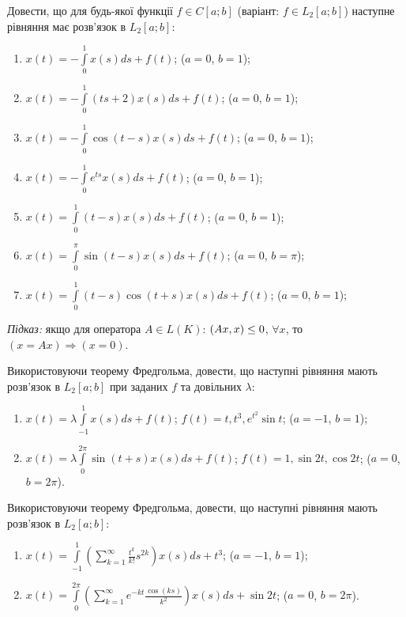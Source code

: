 \begin{exercise}
    Довести, що для будь-якої функції $f \in C[a;b]$ (варіант: $f \in L_2[a;b]$)
    наступне рівняння має розв'язок в $L_2[a;b]$:
    \begin{enumerate}
        \item $x(t) = -\int\limits^1_0 x(s) ds + f(t)$; ($a=0$, $b=1$);
        \item $x(t) = -\int\limits^1_0 (ts+2)x(s)ds + f(t)$; ($a=0$, $b=1$);
        \item $x(t) = -\int\limits^1_0 \cos(t-s)x(s)ds + f(t)$; ($a=0$, $b=1$);
        \item $x(t) = -\int\limits^1_0 e^{ts}x(s)ds + f(t)$; ($a=0$, $b=1$);
        \item $x(t) = \int\limits^1_0 (t-s)x(s)ds + f(t)$; ($a=0$, $b=1$);
        \item $x(t) = \int\limits^\pi_0 \sin(t-s)x(s)ds + f(t)$; ($a=0$, $b=\pi$);
        \item $x(t) = \int\limits^1_0 (t-s)\cos(t+s)x(s)ds + f(t)$; ($a=0$, $b=1$);
    \end{enumerate}
\end{exercise}

\begin{theory}
    \textit{Підказ:} якщо для оператора $A\in L(K)$: $\left(Ax, x\right) \leq 0$, $\forall x$,
    то $(x=Ax) \Rightarrow (x=0)$.
\end{theory}

\begin{exercise}
    Використовуючи теорему Фредгольма, довести, що наступні рівняння мають розв'язок в $L_2[a;b]$
    при заданих $f$ та довільних $\lambda$:
    \begin{enumerate}
        \item $x(t) = \lambda \int\limits^1_{-1} x(s) ds + f(t)$;
              $f(t) = t, t^3, e^{t^2}\sin t$; ($a=-1$, $b=1$);
        \item $x(t) = \lambda \int\limits^{2\pi}_0 \sin(t+s) x(s) ds + f(t)$; 
              $f(t) = 1, \sin 2t, \cos 2t$; ($a=0$, $b=2\pi$).
    \end{enumerate}
\end{exercise}

\begin{exercise}
    Використовуючи теорему Фредгольма, довести, що наступні рівняння мають розв'язок в $L_2[a;b]$:
    \begin{enumerate}
        \item $x(t) = \int\limits^1_{-1} \left(
                \sum\limits^\infty_{k=1} \frac{t^k}{k!} s^{2k}
            \right) x(s) ds + t^3$; ($a=-1$, $b=1$);
        \item $x(t) = \int\limits^{2\pi}_0 \left(
                \sum\limits^\infty_{k=1} e^{-kt} \frac{\cos(ks)}{k^2}
            \right) x(s) ds + \sin 2t$; ($a=0$, $b=2\pi$).
    \end{enumerate}
\end{exercise}

